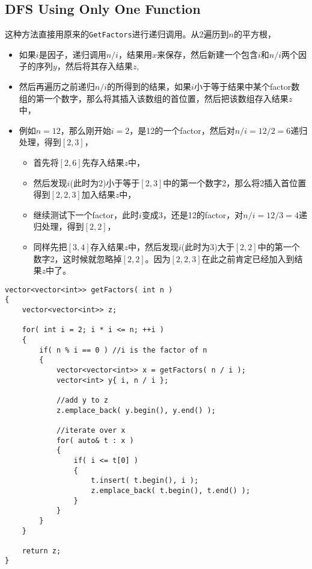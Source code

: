 \subsection{DFS Using Only One Function}
这种方法直接用原来的\texttt{GetFactors}进行递归调用。从2遍历到$n$的平方根，
\begin{itemize}
\item 如果$i$是因子，递归调用$n/i$，结果用$x$来保存，然后新建一个包含$i$和$n/i$两个因子的序列$y$，然后将其存入结果$z$,
\item 然后再遍历之前递归$n/i$的所得到的结果，如果$i$小于等于结果中某个factor数组的第一个数字，那么将其插入该数组的首位置，然后把该数组存入结果$z$中，
\item 例如$n = 12$，那么刚开始$i = 2$，是12的一个factor，然后对$n/i=12/2=6$递归处理，得到$[2,3]$，
\begin{itemize}
\item 首先将$[2, 6]$先存入结果$z$中，
\item 然后发现$i$(此时为2)小于等于$[2, 3]$中的第一个数字2，那么将2插入首位置得到$[2, 2, 3]$加入结果$z$中，
\item 继续测试下一个factor，此时$i$变成3，还是12的factor，对$n/i=12/3=4$递归处理，得到$[2, 2]$，
\item 同样先把$[3, 4]$存入结果$z$中，然后发现$i$(此时为3)大于$[2, 2]$中的第一个数字2，这时候就忽略掉$[2,2]$。因为$[2,2,3]$在此之前肯定已经加入到结果$z$中了。
\end{itemize}
\end{itemize}
\begin{lstlisting}[style=customc, caption={Another DFS Approach}]
vector<vector<int>> getFactors( int n )
{
    vector<vector<int>> z;

    for( int i = 2; i * i <= n; ++i )
    {
        if( n % i == 0 ) //i is the factor of n
        {
            vector<vector<int>> x = getFactors( n / i );
            vector<int> y{ i, n / i };

            //add y to z
            z.emplace_back( y.begin(), y.end() );

            //iterate over x
            for( auto& t : x )
            {
                if( i <= t[0] )
                {
                    t.insert( t.begin(), i );
                    z.emplace_back( t.begin(), t.end() );
                }
            }
        }
    }

    return z;
}
\end{lstlisting}